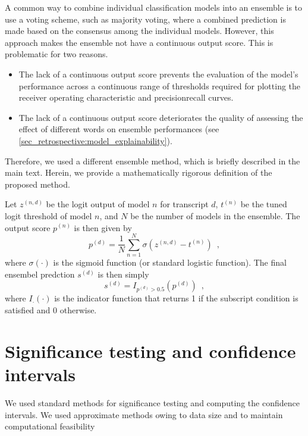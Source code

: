 {A common way to combine individual classification models into an ensemble is to use a voting scheme, such as majority voting, where a combined prediction is made based on the consensus among the individual models. However, this approach makes the ensemble not have a continuous output score. This is problematic for two reasons.
%
\begin{itemize}
    \item The lack of a continuous output score prevents the evaluation of the model's performance across a continuous range of thresholds required for plotting the receiver operating characteristic and precisionrecall curves.
    \item The lack of a continuous output score deteriorates the quality of assessing the effect of different words on ensemble performances (see \cref{sec_retrospective:model_explainability}).
\end{itemize}
%
Therefore, we used a different ensemble method, which is briefly described in the main text. Herein, we provide a mathematically rigorous definition of the proposed method.

Let $z^{(n,d)}$ be the logit output of model $n$ for transcript $d$, $t^{(n)}$ be the tuned logit threshold of model $n$, and $N$ be the number of models in the ensemble. The output score $p^{(n)}$ is then given by 
%
\begin{equation}
    p^{(d)} = \frac{1}{N} \sum_{n=1}^N \sigma(z^{(n,d)} - t^{(n)}) \enspace ,
\end{equation}
%
where $\sigma(\cdot)$ is the sigmoid function (or standard logistic function). The final ensembel predction $s^{(d)}$ is then simply 
%
\begin{equation}
    s^{(d)} = I_{p^{(d)} > 0.5}(p^{(d)}) \enspace ,
\end{equation}
%
where $I_{\cdot}(\cdot)$ is the indicator function that returns 1 if the subscript condition is satisfied and 0 otherwise. 


\section{Significance testing and confidence intervals}

We used standard methods for significance testing and computing the confidence intervals. We used approximate methods owing to data size and to maintain computational feasibility \cite{dwass_modified_1957,eden_validity_1933}

}
